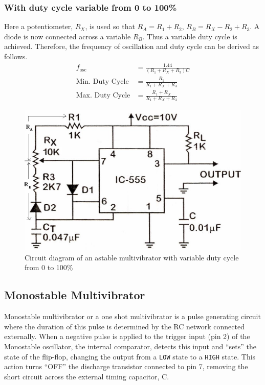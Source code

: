 \subsubsection{With duty cycle variable from 0 to 100\%}
Here a potentiometer, $R_X$, is
used so that $R_A = R_1+R_2$, $R_B = R_X-R_2+R_3$. A diode is now connected across a variable $R_B$.
Thus a variable duty cycle is achieved. Therefore, the frequency of oscillation and duty
cycle can be derived as follows.
\begin{align}
    f_\text{osc} &= \frac{1.44}{(R_1+R_X+R_3)C}\\
    \text{Min. Duty Cycle} &= \frac{R_1}{R_1+R_X+R_3}\\
    \text{Max. Duty Cycle} &= \frac{R_1+R_X}{R_1+R_X+R_3}
\end{align}

\begin{figure}[H]
    \centering
    \includegraphics[width=0.7\columnwidth]{images/ast4.png}
    \caption{Circuit diagram of an astable multivibrator with variable duty cycle from 0 to 100\%}
    \label{ast4}
\end{figure}

\subsection{Monostable Multivibrator}

Monostable multivibrator or a one shot multivibrator is a pulse generating
circuit where the duration of this pulse is determined by the RC network connected
externally. When a negative pulse is applied to the trigger input (pin 2) of the Monostable oscillator, the internal comparator, detects this input and “sets” the state of the flip-flop, changing the output from a \verb|LOW| state to a \verb|HIGH| state. This action  turns “OFF” the discharge transistor connected to pin 7, removing the short circuit across the external timing capacitor, C.

